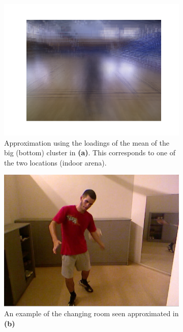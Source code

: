 \begin{figure}
\begin{subfigure}{.4\linewidth}
    \end{subfigure}
    \begin{subfigure}{.4\linewidth}
        \centering
        \captionsetup{width=.95\linewidth}
        \includegraphics[width=\linewidth]{Pics/06_results/loc2.png}
        \caption{Approximation using the loadings of the mean of the big (bottom) cluster in \textbf{(a)}. This corresponds to one of the two locations (indoor arena).}
    \end{subfigure}
    \begin{subfigure}{.4\linewidth}
        \centering
        \captionsetup{width=.95\linewidth}
        \includegraphics[width=.78\linewidth]{Pics/06_results/loc_1_real.png}
        \caption{An example of the changing room seen approximated in \textbf{(b)}}
    \end{subfigure}
    \begin{subfigure}{.4\linewidth}

\end{subfigure}
\end{figure}
